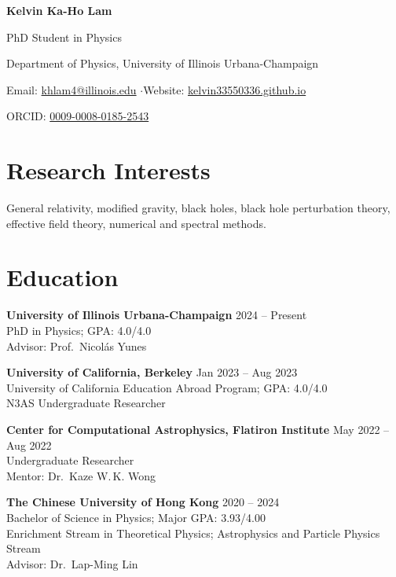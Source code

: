\documentclass[11pt]{article}
\newcommand{\entry}[2]{\textbf{#1} \hfill #2 \\}
\begin{document}
{\LARGE \textbf{Kelvin Ka-Ho Lam}}\par
\vspace{4pt}
PhD Student in Physics\par
Department of Physics, University of Illinois Urbana-Champaign\par
\vspace{4pt}
Email: \href{mailto:khlam4@illinois.edu}{khlam4@illinois.edu}
\quad$\cdot$\quad Website: \href{https://kelvin33550336.github.io}{kelvin33550336.github.io}\par
ORCID: \href{https://orcid.org/0009-0008-0185-2543}{0009-0008-0185-2543}\par

\section*{Research Interests}
General relativity, modified gravity, black holes, black hole perturbation theory, effective field theory, numerical and spectral methods.

\section*{Education}
\entry{University of Illinois Urbana-Champaign}{2024 -- Present}
PhD in Physics; GPA: 4.0/4.0\\
Advisor: Prof.\ Nicolás Yunes

\vspace{6pt}
\entry{University of California, Berkeley}{Jan 2023 -- Aug 2023}
University of California Education Abroad Program; GPA: 4.0/4.0\\
N3AS Undergraduate Researcher

\vspace{6pt}
\entry{Center for Computational Astrophysics, Flatiron Institute}{May 2022 -- Aug 2022}
Undergraduate Researcher\\
Mentor: Dr.\ Kaze W.\,K. Wong

\vspace{6pt}
\entry{The Chinese University of Hong Kong}{2020 -- 2024}
Bachelor of Science in Physics; Major GPA: 3.93/4.00\\
Enrichment Stream in Theoretical Physics; Astrophysics and Particle Physics Stream\\
Advisor: Dr.\ Lap-Ming Lin
\end{document}
